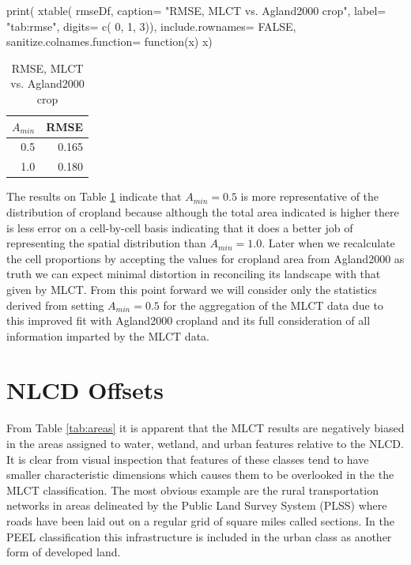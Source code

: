 \begin{Schunk}
\begin{Sinput}
 print( xtable( rmseDf,
               caption= "RMSE, MLCT vs. Agland2000 crop",
               label= "tab:rmse",
               digits= c( 0, 1, 3)),
       include.rownames= FALSE,
       sanitize.colnames.function= function(x) x)
\end{Sinput}
\begin{table}[ht]
\begin{center}
\begin{tabular}{rr}
  \hline
$A_{min}$ & RMSE \\ 
  \hline
0.5 & 0.165 \\ 
  1.0 & 0.180 \\ 
   \hline
\end{tabular}
\caption{RMSE, MLCT vs. Agland2000 crop}
\label{tab:rmse}
\end{center}
\end{table}\begin{Sinput}
 
\end{Sinput}
\end{Schunk}

The results on Table \ref{tab:rmse} indicate that $A_{min}=0.5$ is
more representative of the distribution of cropland because although
the total area indicated is higher there is less error on a
cell-by-cell basis indicating that it does a better job of
representing the spatial distribution than $A_{min}=1.0$.  Later when
we recalculate the cell proportions by accepting the values for
cropland area from Agland2000 as truth we can expect minimal
distortion in reconciling its landscape with that given by MLCT.  From
this point forward we will consider only the statistics derived from
setting $A_{min}=0.5$ for the aggregation of the MLCT data due to this
improved fit with Agland2000 cropland and its full consideration of
all information imparted by the MLCT data.


\section{NLCD Offsets}
\label{nlcd_offsets}


From Table \ref{tab:areas} it is apparent that the MLCT results are
negatively biased in the areas assigned to water, wetland, and urban
features relative to the NLCD.  It is clear from visual inspection
that features of these classes tend to have smaller characteristic
dimensions which causes them to be overlooked in the the MLCT
classification.  The most obvious example are the rural transportation
networks in areas delineated by the Public Land Survey System (PLSS)
where roads have been laid out on a regular grid of square miles
called sections.  In the PEEL classification this infrastructure is
included in the urban class as another form of developed land.

